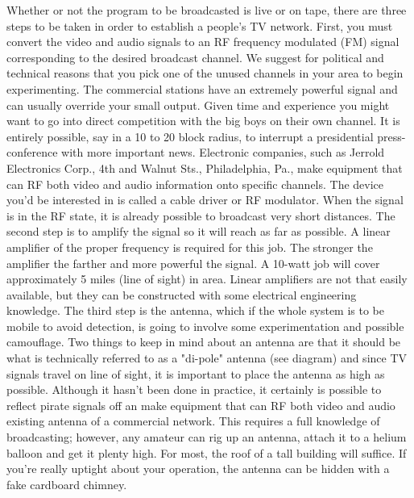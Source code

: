 \documentclass[11pt,twoside,a4paper]{book}
\begin{document}
Whether or not the program to be broadcasted is live or on tape, there are three steps to be taken in order to establish a people's TV network. First, you must convert the video and audio signals to an RF frequency modulated (FM) signal corresponding to the desired broadcast channel. We suggest for political and technical reasons that you pick one of the unused channels in your area to begin experimenting. The commercial stations have an extremely powerful signal and can usually override your small output. Given time and experience you might want to go into direct competition with the big boys on their own channel. It is entirely possible, say in a 10 to 20 block radius, to interrupt a presidential press-conference with more important news. Electronic companies, such as Jerrold Electronics Corp., 4th and Walnut Sts., Philadelphia, Pa., make equipment that can RF both video and audio information onto specific channels. The device you'd be interested in is called a cable driver or RF modulator.  When the signal is in the RF state, it is already possible to broadcast very short distances. The second step is to amplify the signal so it will reach as far as possible. A linear amplifier of the proper frequency is required for this job. The stronger the amplifier the farther and more powerful the signal. A 10-watt job will cover approximately 5 miles (line of sight) in area. Linear amplifiers are not that easily available, but they can be constructed with some electrical engineering knowledge. The third step is the antenna, which if the whole system is to be mobile to avoid detection, is going to involve some experimentation and possible camouflage. Two things to keep in mind about an antenna are that it should be what is technically referred to as a "di-pole" antenna (see diagram) and since TV signals travel on line of sight, it is important to place the antenna as high as possible. Although it hasn't been done in practice, it certainly is possible to reflect pirate signals off an make equipment that can RF both video and audio existing antenna of a commercial network. This requires a full knowledge of broadcasting; however, any amateur can rig up an antenna, attach it to a helium balloon and get it plenty high. For most, the roof of a tall building will suffice. If you're really uptight about your operation, the antenna can be hidden with a fake cardboard chimney.~\\

\clearpage
\end{document}
